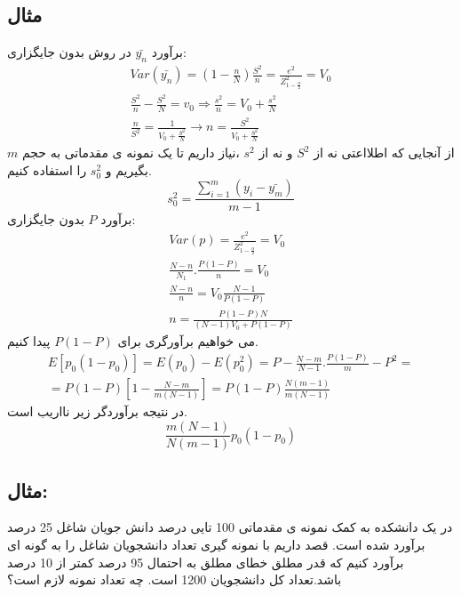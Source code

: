 \subsection*{مثال}
برآورد 
$\bar{y_n}$
در روش 
بدون جایگزاری:
\begin{gather*}
	Var(\bar{y_n})=(1-\frac{n}{N})\frac{S^2}{n}=\frac{e^2}{Z^2_{1-\frac{\alpha}{2}}}=V_0 \\
	\frac{S^2}{n}-\frac{S^2}{N}=v_0 \Rightarrow \frac{s^2}{n}=V_0+\frac{s^2}{N} \\
	\frac{n}{S^2}=\frac{1}{V_0+\frac{S^2}{N}} \rightarrow n=\frac{S^2}{V_0+\frac{S^2}{N}}
\end{gather*}
از آنجایی که اطلااعتی نه از 
$S^2$
و نه از 
$s^2$
،نیاز داریم تا یک نمونه ی مقدماتی به حجم 
$m$
بگیریم و 
$s_0^2$
را استفاده کنیم.
\begin{equation*}
	s_0^2=\frac{\sum_{i=1}^{m}(y_i-\bar{y_m})}{m-1}
\end{equation*}
برآورد 
$P$
بدون جایگزاری:
\begin{gather*}
	Var(p)=\frac{e^2}{Z^2_{1-\frac{\alpha}{2}}}=V_0 \\
	\frac{N-n}{N_1}.\frac{P(1-P)}{n}=V_0 \\
	\frac{N-n}{n}=V_0\frac{N-1}{P(1-P)} \\
	n=\frac{P(1-P)N}{(N-1)V_0+P(1-P)}
\end{gather*}
می خواهیم برآورگری برای 
$P(1-P)$
پیدا کنیم.
\begin{multline*}
	E[p_0(1-p_0)]=E(p_0)-E(p_0^2)=P-\frac{N-m}{N-1}.\frac{P(1-P)}{m}-P^2 
	=\\=
	P(1-P)[1-\frac{N-m}{m(N-1)}]
	=P(1-P)\frac{N(m-1)}{m(N-1)}
\end{multline*}
در نتیجه برآوردگر زیر نااریب است.
\begin{equation*}
	\frac{m(N-1)}{N(m-1)}p_0(1-p_0)
\end{equation*}
\subsection*{مثال:}
در یک دانشکده به کمک نمونه ی مقدماتی 100 تایی درصد دانش جویان شاغل 25 درصد برآورد شده است. قصد داریم با نمونه گیری
تعداد دانشجویان شاغل را به گونه ای برآورد کنیم که قدر مطلق خطای مطلق به احتمال 95 درصد کمتر از 10 درصد باشد.تعداد کل دانشجویان 1200 است. چه تعداد نمونه لازم است؟
